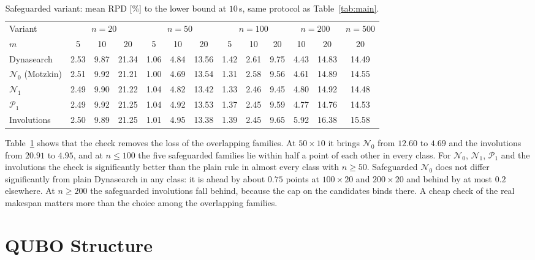 \documentclass{article}
\newcommand{\N}{\mathcal{N}}
\newcommand{\Pa}{\mathcal{P}}
\begin{document}
\begin{table}[t]
\centering
\caption{Safeguarded variant: mean RPD [\%] to the lower bound at
$10$\,s, same protocol as Table~\ref{tab:main}.}
\label{tab:safe}
\small
\begin{tabular}{@{}l*{12}{c}@{}}
\toprule
Variant & \multicolumn{3}{c}{$n=20$} & \multicolumn{3}{c}{$n=50$} &
\multicolumn{3}{c}{$n=100$} & \multicolumn{2}{c}{$n=200$} & $n=500$ \\
$m$ & 5 & 10 & 20 & 5 & 10 & 20 & 5 & 10 & 20 & 10 & 20 & 20 \\
\midrule
Dynasearch & 2.53 & 9.87 & 21.34 & 1.06 & 4.84 & 13.56 & 1.42 & 2.61 & 9.75 & 4.43 & 14.83 & 14.49 \\
$\N_0$ (Motzkin) & 2.51 & 9.92 & 21.21 & 1.00 & 4.69 & 13.54 & 1.31 & 2.58 & 9.56 & 4.61 & 14.89 & 14.55 \\
$\N_1$ & 2.49 & 9.90 & 21.22 & 1.04 & 4.82 & 13.42 & 1.33 & 2.46 & 9.45 & 4.80 & 14.92 & 14.48 \\
$\Pa_1$ & 2.49 & 9.92 & 21.25 & 1.04 & 4.92 & 13.53 & 1.37 & 2.45 & 9.59 & 4.77 & 14.76 & 14.53 \\
Involutions & 2.50 & 9.89 & 21.25 & 1.01 & 4.95 & 13.38 & 1.39 & 2.45 & 9.65 & 5.92 & 16.38 & 15.58 \\
\bottomrule
\end{tabular}
\end{table}

Table~\ref{tab:safe} shows that the check removes the loss of the
overlapping families. At $50\times10$ it brings $\N_0$ from $12.60$ to
$4.69$ and the involutions from $20.91$ to $4.95$, and at $n\leq100$
the five safeguarded families lie within half a point of each other in
every class. For $\N_0$, $\N_1$, $\Pa_1$ and the involutions the check
is significantly better than the plain rule in almost every class with
$n\geq50$. Safeguarded $\N_0$ does not differ significantly from plain
Dynasearch in any class: it is ahead by about $0.75$ points at
$100\times20$ and $200\times20$ and behind by at most $0.2$ elsewhere.
At $n\geq200$ the safeguarded involutions fall behind, because the cap
on the candidates binds there. A cheap check of the real makespan
matters more than the choice among the overlapping families.

\section{QUBO Structure}\label{sec:quantum}
\end{document}
